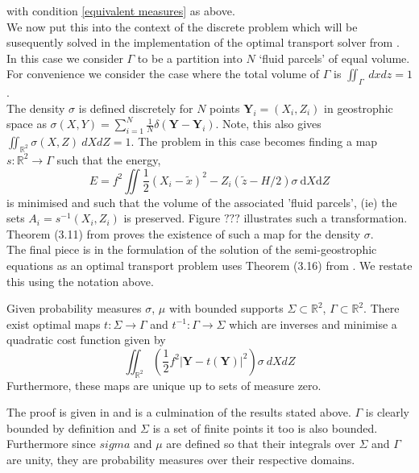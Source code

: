 with condition \ref{equivalent measures} as above.
\\
\linebreak
We now put this into the context of the discrete problem which will be susequently solved in the implementation of the optimal transport solver from \cite{Merigot2017}.
In this case we consider $\Gamma$ to be a partition into $N$ {\textquoteleft fluid parcels\textquoteright} of equal volume. For convenience we consider the case where the total volume of $\Gamma$ is $\iint_{\Gamma} \ dxdz = 1$.
\\
\linebreak
The density $\sigma$ is defined discretely for $N$ points $\bm{Y}_i = \left(X_i,Z_i\right)$ in geostrophic space as $\sigma(X,Y) = \sum_{i=1}^{N}\frac{1}{N}\delta\left(\bm{Y}-\bm{Y}_i\right)$. Note, this also gives $	\iint_{\mathbb{R}^2} \sigma\left(X,Z\right) \ dXdZ = 1$. The problem in this case becomes finding a map $s: \mathbb{R}^2 \rightarrow \Gamma$ such that the energy,
\begin{equation}
E = f^2 \iint \frac{1}{2}\left(X_i-\tilde{x}\right)^2 - Z_i\left(\tilde{z} - H/2\right)\sigma \ \textrm{d}X\textrm{d}Z
\end{equation}
is minimised and such that the volume of the associated 'fluid parcels', (ie) the sets $A_i = s^{-1}(X_i,Z_i)$ is preserved. Figure $???$ illustrates such a transformation. Theorem (3.11) from \cite{Cullen2006a} proves the existence of such a map for the density $\sigma$.  
\\
\linebreak
The final piece is in the formulation of the solution of the semi-geostrophic equations as an optimal transport problem uses Theorem (3.16) from \cite{Cullen2006a}. We restate this using the notation above.
\begin{theorem}
	Given probability measures $\sigma$, $\mu$ with bounded supports $\Sigma \subset \mathbb{R}^2$, $\Gamma \subset \mathbb{R}^2 $. There exist optimal maps $t: \Sigma \rightarrow \Gamma$ and $t^{-1}: \Gamma \rightarrow \Sigma$ which are inverses and minimise a quadratic cost function given by
	\begin{equation*}
		\iint_{\mathbb{R}^2} \left(\frac{1}{2}f^2|\bm{Y}-t(\bm{Y})|^2\right)\sigma \ dXdZ
	\end{equation*}
	Furthermore, these maps are unique up to sets of measure zero.
\end{theorem}
The proof is given in \cite{Cullen2006a} and is a culmination of the results stated above. $\Gamma$ is clearly bounded by definition and $\Sigma$ is a set of finite points it too is also bounded. Furthermore since $sigma$ and $\mu$ are defined so that their integrals over $\Sigma$ and $\Gamma$ are unity, they are probability measures over their respective domains.
